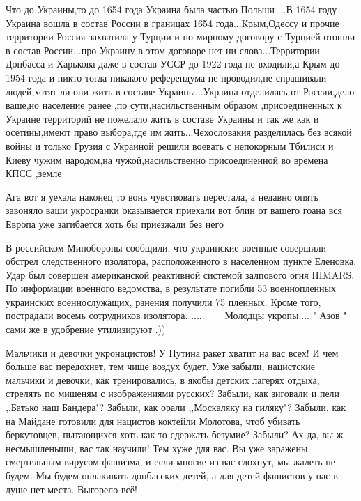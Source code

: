 Что до Украины,то до 1654 года Украина была частью Польши ...В 1654 году
Украина вошла в состав России в границах 1654 года...Крым,Одессу и прочие
территории Россия захватила у Турции и по мирному договору с Турцией отошли в
состав России...про Украину в этом договоре нет ни слова...Территории Донбасса
и Харькова даже в состав УССР до 1922 года не входили,а Крым до 1954 года и
никто тогда никакого референдума не проводил,не спрашивали людей,хотят ли они
жить в составе Украины...Украина отделилась от России,дело ваше,но население
ранее ,по сути,насильственным образом ,присоединенных к Украине территорий не
пожелало жить в составе Украины и так же как и осетины,имеют право выбора,где
им жить...Чехословакия разделилась без всякой войны и только Грузия с Украиной
решили воевать с непокорным Тбилиси и Киеву чужим народом,на
чужой,насильственно присоединенной во времена КПСС ,земле

Ага вот я уехала наконец то вонь чувствовать перестала, а недавно опять
завоняло ваши укросранки оказывается приехали вот блин от вашего гоана вся
Европа уже загибается хоть бы приезжали без него

В российском Минобороны сообщили, что украинские военные совершили обстрел следственного изолятора, расположенного в населенном пункте Еленовка.
Удар был совершен американской реактивной системой залпового огня HIMARS. По информации военного ведомства, в результате погибли 53 военнопленных украинских военнослужащих, ранения получили 75 пленных. Кроме того, пострадали восемь сотрудников изолятора.
.....
🤪🤣🤪🤪🤪
Молодцы укропы....
" Азов " сами же в удобрение утилизируют .))

Мальчики и девочки укронацистов! У Путина ракет хватит на вас всех! И чем больше вас передохнет, тем чище воздух будет.
Уже забыли, нацистские мальчики и девочки, как тренировались, в якобы детских лагерях отдыха, стрелять по мишеням с изображениями русских? Забыли, как зиговали и пели ,,Батько наш Бандера"?
Забыли, как орали ,,Москаляку на гиляку"?
Забыли, как на Майдане готовили для нацистов коктейли Молотова, чтоб убивать беркутовцев, пытающихся хоть как-то сдержать безумие?
Забыли?
Ах да, вы ж несмышленыши, вас так научили! Тем хуже для вас. Вы уже заражены смертельным вирусом фашизма, и если многие из вас сдохнут, мы жалеть не будем.
Мы будем оплакивать донбасских детей, а для детей фашистов у нас в душе нет места. Выгорело всё!

